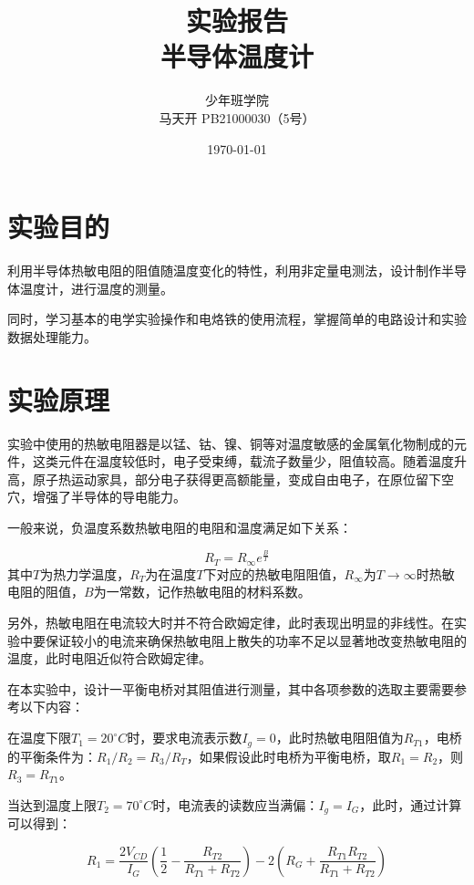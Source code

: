 \documentclass[a4paper]{ltxdoc}
\title{实验报告\\半导体温度计}
\author{少年班学院\\马天开 PB21000030（5号）}
\date{\today}
\begin{document}
\begin{multicols}{2}
    \maketitle
    \section{实验目的}
    利用半导体热敏电阻的阻值随温度变化的特性，利用非定量电测法，设计制作半导体温度计，进行温度的测量。

    同时，学习基本的电学实验操作和电烙铁的使用流程，掌握简单的电路设计和实验数据处理能力。

    \section{实验原理}
    实验中使用的热敏电阻器是以锰、钴、镍、铜等对温度敏感的金属氧化物制成的元件，这类元件在温度较低时，电子受束缚，载流子数量少，阻值较高。随着温度升高，原子热运动家具，部分电子获得更高额能量，变成自由电子，在原位留下空穴，增强了半导体的导电能力。

    一般来说，负温度系数热敏电阻的电阻和温度满足如下关系：

    \begin{equation}
        R_T = R_{\infty} e^{\frac{B}{T}}
    \end{equation}
    其中$T$为热力学温度，$R_T$为在温度$T$下对应的热敏电阻阻值，$R_{\infty}$为$T\to \infty$时热敏电阻的阻值，$B$为一常数，记作热敏电阻的材料系数。

    另外，热敏电阻在电流较大时并不符合欧姆定律，此时表现出明显的非线性。在实验中要保证较小的电流来确保热敏电阻上散失的功率不足以显著地改变热敏电阻的温度，此时电阻近似符合欧姆定律。

    在本实验中，设计一平衡电桥对其阻值进行测量，其中各项参数的选取主要需要参考以下内容：

    在温度下限$T_1 = 20^{\circ}C$时，要求电流表示数$I_g = 0$，此时热敏电阻阻值为$R_{T1}$，电桥的平衡条件为：$R_1/R_2 = R_3/R_T$，如果假设此时电桥为平衡电桥，取$R_1 = R_2$，则$R_3 = R_{T1}$。

    当达到温度上限$T_2 = 70^{\circ} C$时，电流表的读数应当满偏：$I_g = I_G$，此时，通过计算可以得到：

    \begin{equation}
        R_1 = \dfrac{2V_{CD}}{I_G}(\dfrac 1 2 - \dfrac{R_{T2}}{R_{T1} + R_{T2}}) - 2(R_G + \dfrac {R_{T1}R_{T2}}{R_{T1}+R_{T2}})
        \label{eq:R1}
    \end{equation}


\end{multicols}
\end{document}
